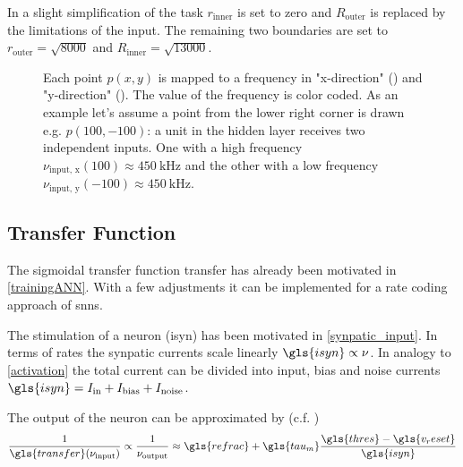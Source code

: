 In a slight simplification of the task $r_{\text{inner}}$ is set to zero and $R_{\text{outer}}$ is replaced by the limitations of the input. The remaining two boundaries are set to $r_{\text{outer}} = \sqrt{8000}$ and $R_{\text{inner}} = \sqrt{13000}$.

\begin{figure}
	\begin{subfigure}[c]{0.5\textwidth}
		\centering
		\caption{}
		\label{nuxinput}
	\end{subfigure}
	\begin{subfigure}[c]{0.5\textwidth}
		\centering
		\caption{}
		\label{nuyinput}
	\end{subfigure}
	\caption{Each point $p(x,y)$ is mapped to a frequency in "x-direction" () and "y-direction" (). The value of the frequency is color coded. As an example let's assume a point from the lower right corner is drawn e.g. $p(100,-100)$: a unit in the hidden layer receives two independent inputs. One with a high frequency $\nu_{\text{input, x}}(100) \approx \SI{450}{\kilo \Hz}$ and the other with a low frequency $\nu_{\text{input, y}}(-100) \approx \SI{450}{\kilo \Hz}$.}

\end{figure}

\subsection{Transfer Function}

The sigmoidal transfer function \gls{transfer} has already been motivated in \cref{trainingANN}. With a few adjustments it can be implemented for a rate coding approach of \glspl{snn}.

The stimulation of a neuron (\gls{isyn}) has been motivated in \cref{synpatic_input}. In terms of rates the synpatic currents scale linearly $\gls{isyn} \propto \nu$. In analogy to \cref{activation} the total current can be divided into input, bias and noise currents $\gls{isyn} = I_\text{in} + I_\text{bias} + I_\text{noise}$.

The output of the neuron can be approximated by (c.f. \cite{brunel2000dynamics})
\begin{equation}\label{fireratehigh}
\frac{1}{\gls{transfer}(\nu_\text{input})} \propto \frac{1}{\nu_\text{output}} \approx \gls{refrac} + \gls{tau_m} \frac{\gls{thres} - \gls{v_reset}}{\gls{isyn}}
\end{equation}

